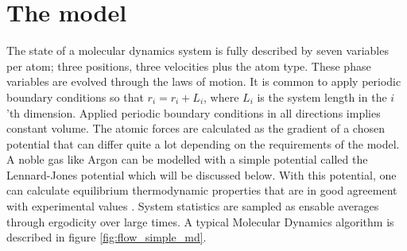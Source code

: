 \section{The model}
The state of a molecular dynamics system is fully described by seven variables per atom; three positions, three velocities plus the atom type. These phase variables are evolved through the laws of motion. It is common to apply periodic boundary conditions so that $r_i = r_i + L_i$, where $L_i$ is the system length in the $i$'th dimension. Applied periodic boundary conditions in all directions implies constant volume. The atomic forces are calculated as the gradient of a chosen potential that can differ quite a lot depending on the requirements of the model. A noble gas like Argon can be modelled with a simple potential called the Lennard-Jones potential which will be discussed below. With this potential, one can calculate equilibrium thermodynamic properties that are in good agreement with experimental values \cite{verlet1967computer}. System statistics are sampled as ensable averages through ergodicity over large times. A typical Molecular Dynamics algorithm is described in figure \ref{fig:flow_simple_md}.
